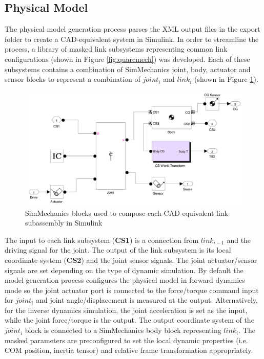 \subsection{Physical Model} %
\label{sub:physical_model}

The physical model generation process parses the XML output files in the export folder to create a CAD-equivalent system in Simulink. In order to streamline the process, a library of masked link subsystems representing common link configurations (shown in Figure \ref{fig:quarcmech}) was developed. Each of these subsystems contains a combination of SimMechanics joint, body, actuator and sensor blocks to represent a combination of $joint_{i}$ and $link_{i}$ (shown in Figure \ref{fig:undermask}).

\begin{figure}[!b]
	\centering
    \includegraphics[scale=0.6]{fig/ch3/undermask.pdf}
  	\caption{SimMechanics blocks used to compose each CAD-equivalent link subassembly in Simulink}
	\label{fig:undermask}
\end{figure}

The input to each link subsystem (\textbf{CS1}) is a connection from $link_{i-1}$ and the driving signal for the joint. The output of the link subsystem is its local coordinate system (\textbf{CS2}) and the joint sensor signals. The joint actuator/sensor signals are set depending on the type of dynamic simulation. By default the model generation process configures the physical model in forward dynamics mode so the joint actuator port is connected to the force/torque command input for $joint_{i}$ and joint angle/displacement is measured at the output. Alternatively, for the inverse dynamics simulation, the joint acceleration is set as the input, while the joint force/torque is the output. The output coordinate system of the $joint_{i}$ block is connected to a SimMechanics body block representing $link_{i}$. The masked parameters are preconfigured to set the local dynamic properties (i.e. COM position, inertia tensor) and relative frame transformation appropriately.

